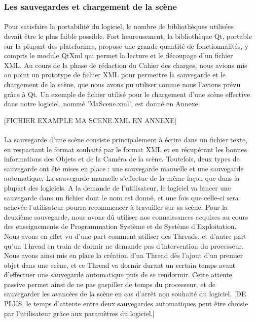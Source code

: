 \subsubsection{Les sauvegardes et chargement de la scène}
\paragraph{}
Pour satisfaire la portabilité du logiciel, le nombre de bibliothèques utilisées devait être le plus faible possible. Fort heureusement, la bibliothèque Qt, portable sur la plupart des plateformes, propose une grande quantité de fonctionnalités, y compris le module QtXml qui permet la lecture et le découpage d'un fichier XML. Au cours de la phase de rédaction du Cahier des charges, nous avions mis au point un prototype de fichier XML pour permettre la sauvegarde et le chargement de la scène, que nous avons pu utiliser comme nous l'avions prévu grâce à Qt. Un exemple de fichier utilisé pour le chargement d'une scène effective dans notre logiciel, nommé 'MaScene.xml', est donné en Annexe.

[FICHIER EXAMPLE MA SCENE.XML EN ANNEXE]

\paragraph{}
La sauvegarde d'une scène consiste principalement à écrire dans un fichier texte, en respactant le format souhaité par le format XML et en récupérant les bonnes informations des Objets et de la Caméra de la scène. Toutefois, deux types de sauvegarde ont été mises en place : une sauvegarde manuelle et une sauvegarde automatique.
La sauvegarde manuelle s'effectue de la même façon que dans la plupart des logiciels. A la demande de l'utilisateur, le logiciel va lancer une sauvegarde dans un fichier dont le nom est donné, et une fois que celle-ci sera achevée l'utilisateur pourra recommencer à travailler sur sa scène.
Pour la deuxième sauvegarde, nous avons dû utiliser nos connaissances acquises au cours des enseignements de Programmation Système et de Système d'Exploitation. Nous avons en effet vu d'une part comment utiliser des Threads, et d'autre part qu'un Thread en train de dormir ne demande pas d'intervention du processeur. Nous avons ainsi mis en place la création d'un Thread dès l'ajout d'un premier objet dans une scène, et ce Thread va dormir durant un certain temps avant d'effectuer une sauvegarde automatique puis de se rendormir. Cette attente passive permet ainsi de ne pas gaspiller de temps du processeur, et de sauvegarder les avancées de la scène en cas d'arrêt non souhaité du logiciel. [DE PLUS, le temps d'attente entre deux sauvegardes automatiques peut être choisie par l'utilisateur grâce aux paramètres du logiciel.]

